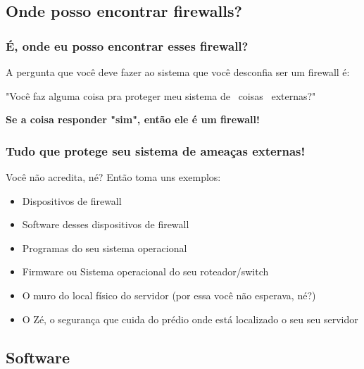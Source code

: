 \subsection{Onde posso encontrar firewalls?}

\begin{frame}

	\frametitle{É, onde eu posso encontrar esses firewall?}

	\begin{block}{A pergunta que você deve fazer ao sistema que você desconfia ser um firewall é:}

	"Você faz alguma coisa pra proteger meu sistema de ~coisas~ externas?"

	\end{block}


	\textbf{Se a coisa responder "sim", então ele é um firewall!}

\end{frame}

\begin{frame}

	\frametitle{Tudo que protege seu sistema de ameaças externas!}
	
	Você não acredita, né? Então toma uns exemplos:

	\begin{itemize}
		\item{Dispositivos de firewall}
		\item{Software desses dispositivos de firewall}
		\item{Programas do seu sistema operacional}
		\item{Firmware ou Sistema operacional do seu roteador/switch}
		\item{O muro do local físico do servidor (por essa você não esperava, né?)}
		\item{O Zé, o segurança que cuida do prédio onde está localizado o seu seu servidor}
	\end{itemize}

\end{frame}

\subsection{Software}




